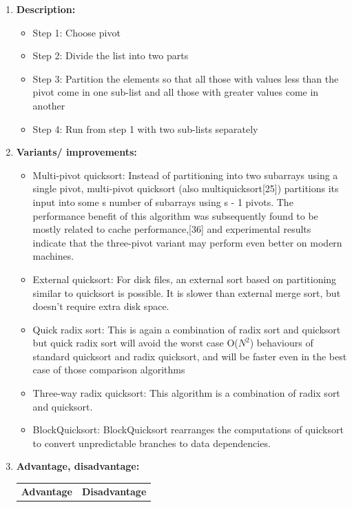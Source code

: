 \documentclass[11pt,a4paper]{article}
\begin{document}
{\begin{enumerate}[label=\textbf{\arabic*})]
				\item \textbf{Description:}
				\begin{itemize}
					\item Step 1: Choose pivot
                    \item Step 2: Divide the list into two parts
                    \item Step 3: Partition the elements so that all those with values less than the pivot come in one sub-list and all those with greater values come in another
                    \item Step 4: Run from step 1 with two sub-lists separately	
				\end{itemize}
				\item \textbf{Variants/ improvements:}
					\begin{itemize}
						\item Multi-pivot quicksort: Instead of partitioning into two subarrays using a single pivot, multi-pivot quicksort (also multiquicksort[25]) partitions its input into some s number of subarrays using s - 1 pivots. The performance benefit of this algorithm was subsequently found to be mostly related to cache performance,[36] and experimental results indicate that the three-pivot variant may perform even better on modern machines.
                        \item External quicksort: For disk files, an external sort based on partitioning similar to quicksort is possible. It is slower than external merge sort, but doesn't require extra disk space.
						\item Quick radix sort: This is again a combination of radix sort and quicksort but quick radix sort will avoid the worst case O($N^2$) behaviours of standard quicksort and radix quicksort, and will be faster even in the best case of those comparison algorithms
                        \item Three-way radix quicksort: This algorithm is a combination of radix sort and quicksort.
                        \item BlockQuicksort: BlockQuicksort rearranges the computations of quicksort to convert unpredictable branches to data dependencies.
					\end{itemize}
				\item \textbf{Advantage, disadvantage:}
					\begin{table}[H]
						\centering
						\begin{tabular}{|p{8cm}|p{8cm}|}
							\hline
							\textbf{Advantage} & \textbf{Disadvantage} \\

\end{tabular}
\end{table}
\end{enumerate}}
\end{document}
